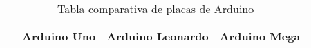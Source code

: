 \begin{longtable}{|p{4.9cm}|p{3.3cm}|p{3.3cm}|p{3.3cm}|}
	\caption[Tabla comparativa de placas de Arduino]{Tabla comparativa de placas de Arduino\cite{comparacion_nodate}}\label{tab:comparativa-placas-arduino}                                                                                                                                          \\

	\hline
	\multicolumn{1}{|c|}{\textbf{ }}            & \multicolumn{1}{|c|}{\textbf{Arduino Uno}}        & \multicolumn{1}{|c|}{\textbf{Arduino Leonardo}}                                 & \multicolumn{1}{|c|}{\textbf{Arduino Mega}}                                                                  \\
	\hline
	\endfirsthead


\end{longtable}
